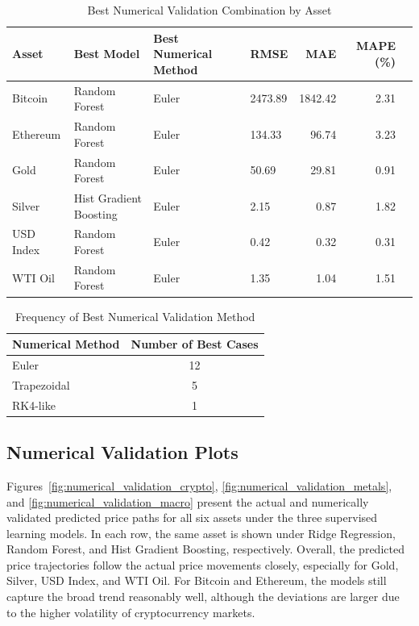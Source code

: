 \documentclass[12pt]{article}
\begin{document}
\begin{table}[H]
\centering
\caption{Best Numerical Validation Combination by Asset}
\label{tab:best_numerical_validation}
\begin{tabular}{llllrrr}
\toprule
Asset & Best Model & Best Numerical Method & RMSE & MAE & MAPE (\%) \\
\midrule
Bitcoin   & Random Forest          & Euler & 2473.89 & 1842.42 & 2.31 \\
Ethereum  & Random Forest          & Euler & 134.33  & 96.74   & 3.23 \\
Gold      & Random Forest          & Euler & 50.69   & 29.81   & 0.91 \\
Silver    & Hist Gradient Boosting & Euler & 2.15    & 0.87    & 1.82 \\
USD Index & Random Forest          & Euler & 0.42    & 0.32    & 0.31 \\
WTI Oil   & Random Forest          & Euler & 1.35    & 1.04    & 1.51 \\
\bottomrule
\end{tabular}
\end{table}

\begin{table}[H]
\centering
\caption{Frequency of Best Numerical Validation Method}
\label{tab:numerical_method_frequency}
\begin{tabular}{lc}
\toprule
Numerical Method & Number of Best Cases \\
\midrule
Euler       & 12 \\
Trapezoidal & 5  \\
RK4-like    & 1  \\
\bottomrule
\end{tabular}
\end{table}

\subsection{Numerical Validation Plots}

Figures~\ref{fig:numerical_validation_crypto}, \ref{fig:numerical_validation_metals}, and \ref{fig:numerical_validation_macro} present the actual and numerically validated predicted price paths for all six assets under the three supervised learning models. In each row, the same asset is shown under Ridge Regression, Random Forest, and Hist Gradient Boosting, respectively. Overall, the predicted price trajectories follow the actual price movements closely, especially for Gold, Silver, USD Index, and WTI Oil. For Bitcoin and Ethereum, the models still capture the broad trend reasonably well, although the deviations are larger due to the higher volatility of cryptocurrency markets.
\end{document}
